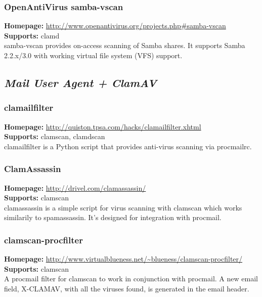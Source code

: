 \documentclass[a4paper,titlepage,12pt]{article}
\begin{document}
    \subsubsection{OpenAntiVirus samba-vscan}\label{samba-vscan}
    \textbf{Homepage:} \url{http://www.openantivirus.org/projects.php#samba-vscan}\\
    \textbf{Supports:} clamd\\[4pt]
    samba-vscan provides on-access scanning of Samba shares. It supports
    Samba 2.2.x/3.0 with working virtual file system (VFS) support. 

    \subsection{\emph{Mail User Agent + ClamAV}}

    \subsubsection{clamailfilter}
    \textbf{Homepage:} \url{http://quiston.tpsa.com/hacks/clamailfilter.xhtml}\\
    \textbf{Supports:} clamscan, clamdscan\\[4pt]
    clamailfilter is a Python script that provides anti-virus scanning via
    procmailrc.

    \subsubsection{ClamAssassin}
    \textbf{Homepage:} \url{http://drivel.com/clamassassin/}\\
    \textbf{Supports:} clamscan\\[4pt]
     clamassassin is a simple script for virus scanning with clamscan which
     works similarily to spamassassin. It's designed for integration with
     procmail.

    \subsubsection{clamscan-procfilter}
    \textbf{Homepage:} \url{http://www.virtualblueness.net/~blueness/clamscan-procfilter/}\\
    \textbf{Supports:} clamscan\\[4pt]
    A procmail filter for clamscan to work in conjunction with procmail.
    A new email field, X-CLAMAV, with all the viruses found, is generated in
    the email header.                       
\end{document}
